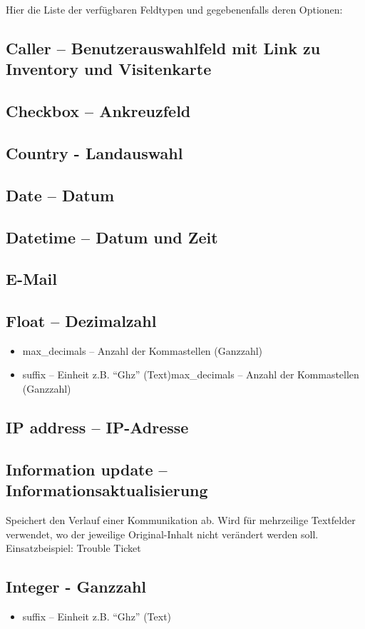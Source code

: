 \documentclass[article, a4paper, oneside, 11pt]{memoir}
\begin{document}
Hier die Liste der verfügbaren Feldtypen und gegebenenfalls deren Optionen:

\subsection[Caller -- Benutzerauswahlfeld mit Link zu Inventory und Visitenkarte]{Caller -- Benutzerauswahlfeld mit Link zu Inventory und Visitenkarte}
\subsection{Checkbox -- Ankreuzfeld}
\subsection{Country - Landauswahl}
\subsection{Date -- Datum}
\subsection{Datetime -- Datum und Zeit}
\subsection{E-Mail}
\subsection{Float -- Dezimalzahl}
\begin{itemize}
\item max\_decimals -- Anzahl der Kommastellen (Ganzzahl)
\item suffix -- Einheit z.B. "`Ghz"' (Text)max\_decimals -- Anzahl der Kommastellen (Ganzzahl)
\end{itemize}
\subsection{IP address -- IP-Adresse}
\subsection{Information update -- Informationsaktualisierung}
Speichert den Verlauf einer Kommunikation ab. Wird für mehrzeilige Textfelder verwendet, wo der jeweilige Original-Inhalt nicht verändert werden soll. Einsatzbeispiel: Trouble Ticket

\subsection{Integer - Ganzzahl}
\begin{itemize}
\item suffix -- Einheit z.B. "`Ghz"' (Text)
\end{itemize}
\end{document}
